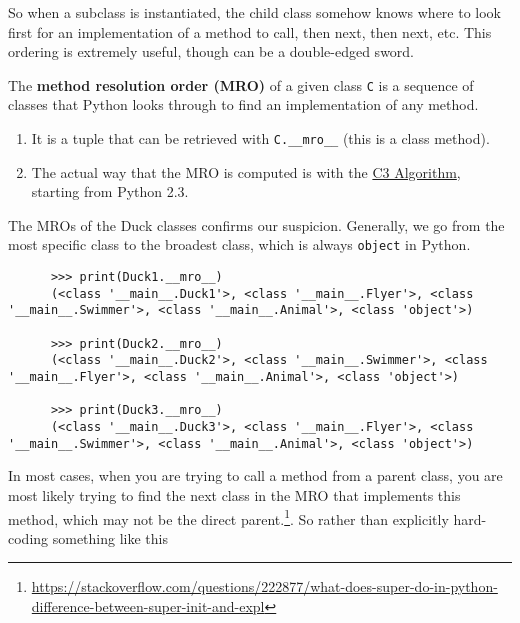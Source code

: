   So when a subclass is instantiated, the child class somehow knows where to look first for an implementation of a method to call, then next, then next, etc. This ordering is extremely useful, though can be a double-edged sword.   

  \begin{definition}
    The \textbf{method resolution order (MRO)} of a given class \texttt{C} is a sequence of classes that Python looks through to find an implementation of any method. 
    \begin{enumerate}
      \item It is a tuple that can be retrieved with \texttt{C.\_\_mro\_\_} (this is a class method). 
      \item The actual way that the MRO is computed is with the \href{https://docs.python.org/3/howto/mro.html}{C3 Algorithm}, starting from Python 2.3.
    \end{enumerate}
  \end{definition}

  \begin{example}
    The MROs of the Duck classes confirms our suspicion. Generally, we go from the most specific class to the broadest class, which is always \texttt{object} in Python. 

    \begin{lstlisting}
      >>> print(Duck1.__mro__)
      (<class '__main__.Duck1'>, <class '__main__.Flyer'>, <class '__main__.Swimmer'>, <class '__main__.Animal'>, <class 'object'>)

      >>> print(Duck2.__mro__)
      (<class '__main__.Duck2'>, <class '__main__.Swimmer'>, <class '__main__.Flyer'>, <class '__main__.Animal'>, <class 'object'>)

      >>> print(Duck3.__mro__)
      (<class '__main__.Duck3'>, <class '__main__.Flyer'>, <class '__main__.Swimmer'>, <class '__main__.Animal'>, <class 'object'>)
    \end{lstlisting}
  \end{example} 

  In most cases, when you are trying to call a method from a parent class, you are most likely trying to find the next class in the MRO that implements this method, which may not be the direct parent.\footnote{\href{https://stackoverflow.com/questions/222877/what-does-super-do-in-python-difference-between-super-init-and-expl}{https://stackoverflow.com/questions/222877/what-does-super-do-in-python-difference-between-super-init-and-expl}}. So rather than explicitly hard-coding something like this 


